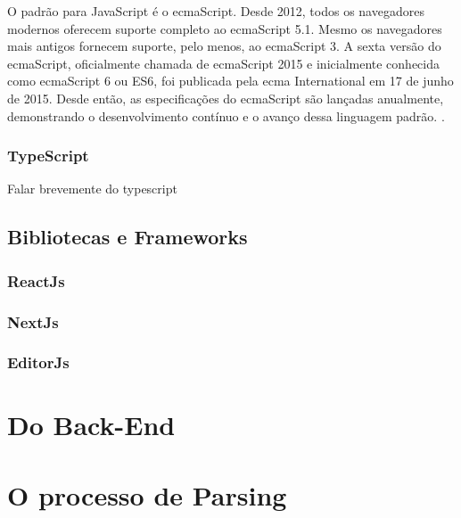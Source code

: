 O padrão para JavaScript é o
\acrshort{ecma}Script.
Desde 2012, todos os navegadores
modernos oferecem suporte completo ao
\acrshort{ecma}Script 5.1. Mesmo os navegadores mais
antigos fornecem suporte, pelo menos, ao
\acrshort{ecma}Script 3. A sexta versão do
\acrshort{ecma}Script,
oficialmente chamada de
\acrshort{ecma}Script 2015 e inicialmente conhecida como
\acrshort{ecma}Script 6
ou ES6, foi publicada pela \acrshort{ecma} International
em 17 de junho de 2015. Desde então, as
especificações do
\acrshort{ecma}Script são lançadas anualmente, demonstrando o desenvolvimento
contínuo e o avanço dessa linguagem padrão.
\cite{mdn-js}.

\subsubsection{TypeScript}

Falar brevemente do typescript

\subsection{Bibliotecas e Frameworks}

\subsubsection{ReactJs}

\subsubsection{NextJs}

\subsubsection{EditorJs}

\section{Do Back-End}

\section{O processo de Parsing}